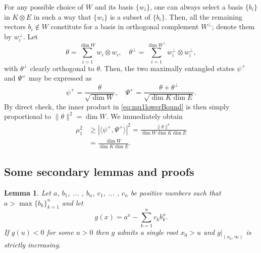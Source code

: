 \documentclass[reqno]{amsart}
\theoremstyle{plain}
\newtheorem{lemma}[theorem]{Lemma}
\theoremstyle{note}
\begin{document}
For any possible choice of $W$ and its basis $\{w_i\}$, one can always select a basis $\{b_i\}$ in $K\otimes E$ in such a way that $\{w_i\}$ is a subset of $\{b_i\}$. Then, all the remaining vectors $b_i \notin W$ constitute for a basis in orthogonal complement $W^\perp$; denote them by $w_{i}^{\perp}$. Let 
\begin{equation}
    \theta = \sum_{i=1}^{\dim{W}} w_i \otimes w_i , \quad \theta^\perp = \sum_{i=1}^{\dim{W^{\perp}}} w_{i}^{\perp} \otimes w_{i}^{\perp},
\end{equation}
with $\theta^\perp$ clearly orthogonal to $\theta$. Then, the two maximally entangled states $\psi^+$ and $\Psi^+$ may be expressed as
\begin{equation}
    \psi^+ = \frac{\theta}{\sqrt{\dim{W}}} , \quad \Psi^+ = \frac{\theta + \theta^\perp}{\sqrt{\dim{K}\dim{E}}}.
\end{equation}
By direct check, the inner product in \eqref{eq:mu1lowerBound} is then simply proportional to $\| \theta \|^{2} = \dim{W}$. We immediately obtain
\begin{align}
     \mu_{1}^{2} &\geqslant \left| \langle \psi^+ , \Psi^+ \rangle \right|^{2} = \frac{\| \theta \|^{4}}{\dim{W}\dim{K}\dim{E}} \\
     &= \frac{\dim{W}}{\dim{K}\dim{E}}.\nonumber
\end{align}

\subsection{Some secondary lemmas and proofs}

\begin{lemma}\label{lemma:ExpFunctionAsymptotics}
    Let $a$, $b_1$, ... , $b_n$, $c_1$, ... , $c_n$ be positive numbers such that $a > \max{\{b_k\}_{k=1}^{n}}$ and let
    \begin{equation}
        g(x) = a^x - \sum_{k=1}^{n} c_k b_{k}^{x} .
    \end{equation}
    If $g(u) < 0$ for some $u > 0$ then $g$ admits a single root $x_0 > u$ and $\left.g\right|_{(x_0,\infty)}$ is strictly increasing.
\end{lemma}
\end{document}
